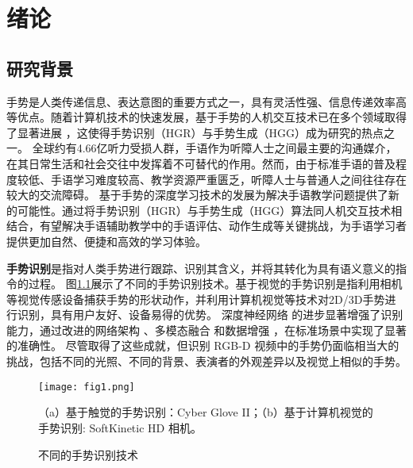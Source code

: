 
\chapter{绪论}
\label{sec:intro}

\section{研究背景}
手势是人类传递信息、表达意图的重要方式之一，具有灵活性强、信息传递效率高等优点\cite{guo2021human}。随着计算机技术的快速发展，基于手势的人机交互技术已在多个领域取得了显著进展 \cite{伍杰2019基于视觉的实时手势识别方法研究, desai2017human,strickland2013using}，这使得手势识别（HGR）与手势生成（HGG）成为研究的热点之一。
全球约有4.66亿听力受损人群，手语作为听障人士之间最主要的沟通媒介，在其日常生活和社会交往中发挥着不可替代的作用。然而，由于标准手语的普及程度较低、手语学习难度较高、教学资源严重匮乏，听障人士与普通人之间往往存在较大的交流障碍。%
基于手势的深度学习技术的发展为解决手语教学问题提供了新的可能性。通过将手势识别（HGR）与手势生成（HGG）算法同人机交互技术相结合，有望解决手语辅助教学中的手语评估、动作生成等关键挑战，为手语学习者提供更加自然、便捷和高效的学习体验。

\textbf{手势识别}是指对人类手势进行跟踪、识别其含义，并将其转化为具有语义意义的指令的过程\cite{rautaray2015vision}。
图\ref{fig:gesture_techniques}展示了不同的手势识别技术。基于视觉的手势识别是指利用相机等视觉传感设备捕获手势的形状动作，并利用计算机视觉等技术对2D/3D手势进行识别，具有用户友好、设备易得的优势。
深度神经网络 \cite{zhou2023unified,li2021trear} 的进步显著增强了识别能力，通过改进的网络架构 \cite{zhu2019redundancy,zhu2018continuous,zhou2022decoupling}、多模态融合 \cite{li2021trear,narayana2018focus,yu2021searching} 和数据增强 \cite{li2021trear,zuo2023natural}，在标准场景中实现了显著的准确性。
尽管取得了这些成就，但识别 RGB-D 视频中的手势仍面临相当大的挑战，包括不同的光照、不同的背景、表演者的外观差异以及视觉上相似的手势。
\begin{figure}
  \centering
  \texttt{[image: fig1.png]}
  \caption*{（a）基于触觉的手势识别：Cyber Glove II\cite{kevin2004}；（b）基于计算机视觉的手势识别: SoftKinetic HD 相机\cite{iisuSDK2012}。}
  \caption{不同的手势识别技术}
  \label{fig:gesture_techniques}
\end{figure}


